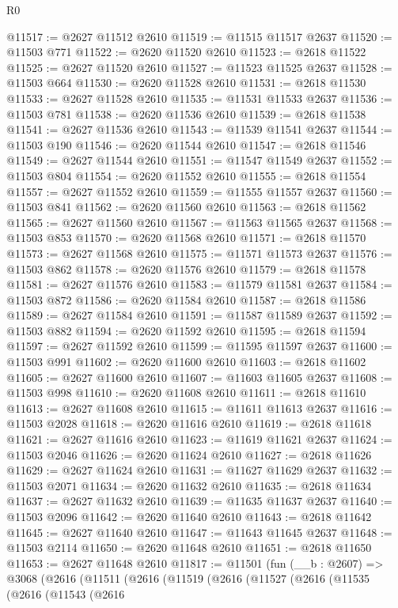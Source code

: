 \begin{lexlean}{R0}
\begin{coremodule}
@11517 := @2627 @11512 @2610
@11519 := @11515 @11517 @2637
@11520 := @11503 @771
@11522 := @2620 @11520 @2610
@11523 := @2618 @11522
@11525 := @2627 @11520 @2610
@11527 := @11523 @11525 @2637
@11528 := @11503 @664
@11530 := @2620 @11528 @2610
@11531 := @2618 @11530
@11533 := @2627 @11528 @2610
@11535 := @11531 @11533 @2637
@11536 := @11503 @781
@11538 := @2620 @11536 @2610
@11539 := @2618 @11538
@11541 := @2627 @11536 @2610
@11543 := @11539 @11541 @2637
@11544 := @11503 @190
@11546 := @2620 @11544 @2610
@11547 := @2618 @11546
@11549 := @2627 @11544 @2610
@11551 := @11547 @11549 @2637
@11552 := @11503 @804
@11554 := @2620 @11552 @2610
@11555 := @2618 @11554
@11557 := @2627 @11552 @2610
@11559 := @11555 @11557 @2637
@11560 := @11503 @841
@11562 := @2620 @11560 @2610
@11563 := @2618 @11562
@11565 := @2627 @11560 @2610
@11567 := @11563 @11565 @2637
@11568 := @11503 @853
@11570 := @2620 @11568 @2610
@11571 := @2618 @11570
@11573 := @2627 @11568 @2610
@11575 := @11571 @11573 @2637
@11576 := @11503 @862
@11578 := @2620 @11576 @2610
@11579 := @2618 @11578
@11581 := @2627 @11576 @2610
@11583 := @11579 @11581 @2637
@11584 := @11503 @872
@11586 := @2620 @11584 @2610
@11587 := @2618 @11586
@11589 := @2627 @11584 @2610
@11591 := @11587 @11589 @2637
@11592 := @11503 @882
@11594 := @2620 @11592 @2610
@11595 := @2618 @11594
@11597 := @2627 @11592 @2610
@11599 := @11595 @11597 @2637
@11600 := @11503 @991
@11602 := @2620 @11600 @2610
@11603 := @2618 @11602
@11605 := @2627 @11600 @2610
@11607 := @11603 @11605 @2637
@11608 := @11503 @998
@11610 := @2620 @11608 @2610
@11611 := @2618 @11610
@11613 := @2627 @11608 @2610
@11615 := @11611 @11613 @2637
@11616 := @11503 @2028
@11618 := @2620 @11616 @2610
@11619 := @2618 @11618
@11621 := @2627 @11616 @2610
@11623 := @11619 @11621 @2637
@11624 := @11503 @2046
@11626 := @2620 @11624 @2610
@11627 := @2618 @11626
@11629 := @2627 @11624 @2610
@11631 := @11627 @11629 @2637
@11632 := @11503 @2071
@11634 := @2620 @11632 @2610
@11635 := @2618 @11634
@11637 := @2627 @11632 @2610
@11639 := @11635 @11637 @2637
@11640 := @11503 @2096
@11642 := @2620 @11640 @2610
@11643 := @2618 @11642
@11645 := @2627 @11640 @2610
@11647 := @11643 @11645 @2637
@11648 := @11503 @2114
@11650 := @2620 @11648 @2610
@11651 := @2618 @11650
@11653 := @2627 @11648 @2610
@11817 := @11501
    (fun (__b : @2607) =>
    @3068
      (@2616
        (@11511
          (@2616
            (@11519
              (@2616
                (@11527
                  (@2616
                    (@11535
                      (@2616
                        (@11543
                          (@2616

\end{coremodule}
\end{lexlean}
